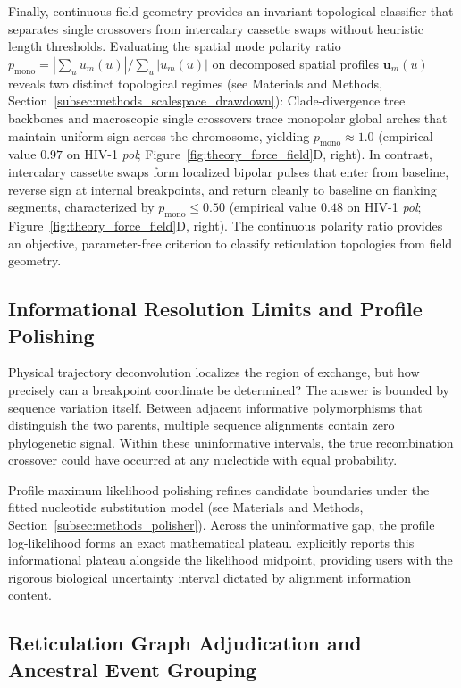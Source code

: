 Finally, continuous field geometry provides an invariant topological classifier that separates single crossovers from intercalary cassette swaps without heuristic length thresholds.
Evaluating the spatial mode polarity ratio $p_{\text{mono}} = |\sum_u u_m(u)| / \sum_u |u_m(u)|$ on decomposed spatial profiles $\mathbf{u}_m(u)$ reveals two distinct topological regimes (see Materials and Methods, Section~\ref{subsec:methods_scalespace_drawdown}):
Clade-divergence tree backbones and macroscopic single crossovers trace monopolar global arches that maintain uniform sign across the chromosome, yielding $p_{\text{mono}} \approx 1.0$ (empirical value $0.97$ on HIV-1 \textit{pol}; Figure~\ref{fig:theory_force_field}D, right).
In contrast, intercalary cassette swaps form localized bipolar pulses that enter from baseline, reverse sign at internal breakpoints, and return cleanly to baseline on flanking segments, characterized by $p_{\text{mono}} \le 0.50$ (empirical value $0.48$ on HIV-1 \textit{pol}; Figure~\ref{fig:theory_force_field}D, right).
The continuous polarity ratio provides an objective, parameter-free criterion to classify reticulation topologies from field geometry.

\subsection{Informational Resolution Limits and Profile Polishing}
\label{subsec:profile_polishing}

Physical trajectory deconvolution localizes the region of exchange, but how precisely can a breakpoint coordinate be determined?
The answer is bounded by sequence variation itself.
Between adjacent informative polymorphisms that distinguish the two parents, multiple sequence alignments contain zero phylogenetic signal.
Within these uninformative intervals, the true recombination crossover could have occurred at any nucleotide with equal probability.

Profile maximum likelihood polishing refines candidate boundaries under the fitted nucleotide substitution model (see Materials and Methods, Section~\ref{subsec:methods_polisher}).
Across the uninformative gap, the profile log-likelihood forms an exact mathematical plateau.
\RhizAeon explicitly reports this informational plateau alongside the likelihood midpoint, providing users with the rigorous biological uncertainty interval dictated by alignment information content.
\subsection{Reticulation Graph Adjudication and Ancestral Event Grouping}
\label{subsec:graph_adjudication}

